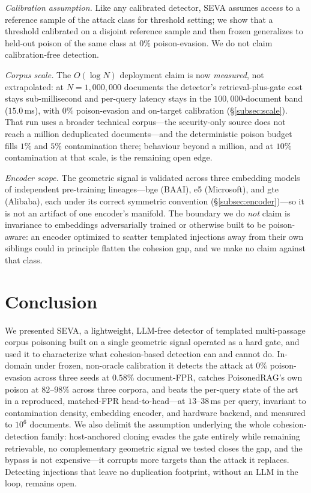 \documentclass[10pt,journal,compsoc]{IEEEtran}
\begin{document}
\emph{Calibration assumption.} Like any calibrated detector, SEVA assumes access
to a reference sample of the attack class for threshold setting; we show that a
threshold calibrated on a disjoint reference sample and then frozen generalizes to
held-out poison of the same class at $0\%$ poison-evasion.
We do not claim calibration-free detection.

\emph{Corpus scale.} The $O(\log N)$ deployment claim is now \emph{measured}, not
extrapolated: at $N=1{,}000{,}000$ documents the detector's retrieval-plus-gate cost
stays sub-millisecond and per-query latency stays in the $100{,}000$-document band
($15.0$\,ms), with $0\%$ poison-evasion and on-target calibration
(\S\ref{subsec:scale}). That run uses a broader technical corpus---the security-only
source does not reach a million deduplicated documents---and the deterministic poison
budget fills $1\%$ and $5\%$ contamination there; behaviour beyond a million, and at
$10\%$ contamination at that scale, is the remaining open edge.

\emph{Encoder scope.} The geometric signal is validated across three embedding models
of independent pre-training lineages---bge (BAAI), e5 (Microsoft), and gte (Alibaba),
each under its correct symmetric convention (\S\ref{subsec:encoder})---so it is not an
artifact of one encoder's manifold. The boundary we do \emph{not} claim is invariance
to embeddings adversarially trained or otherwise built to be poison-aware: an encoder
optimized to scatter templated injections away from their own siblings could in
principle flatten the cohesion gap, and we make no claim against that class.

\section{Conclusion}
We presented SEVA, a lightweight, LLM-free detector of templated multi-passage corpus
poisoning built on a single geometric signal operated as a hard gate, and used it to
characterize what cohesion-based detection can and cannot do. In-domain under frozen,
non-oracle calibration it detects the attack at $0\%$ poison-evasion across three seeds at
$0.58\%$ document-FPR, catches PoisonedRAG's own poison at $82$--$98\%$ across three corpora,
and beats the per-query state of the art in a reproduced, matched-FPR head-to-head---at
$13$--$38$\,ms per query, invariant to contamination density, embedding encoder, and hardware
backend, and measured to $10^6$ documents. We also delimit the assumption underlying the whole
cohesion-detection family: host-anchored cloning evades the gate entirely while remaining
retrievable, no complementary geometric signal we tested closes the gap, and the bypass is not
expensive---it corrupts more targets than the attack it replaces. Detecting injections that leave no
duplication footprint, without an LLM in the loop, remains open.
\end{document}

